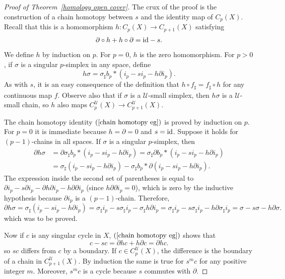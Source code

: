 \begin{proof}[Proof of Theorem~\ref{homology open cover}]
The crux of the proof is the construction of a chain homotopy between $s$ and the identity map of $C_p(X)$. Recall that this is a homomorphism $h:C_p(X)\to C_{p+1}(X)$ satisfying
\begin{align}\label{chain homotopy eg}
\partial\circ h+h\circ\partial=\mathrm{id}-s.
\end{align}
We define $h$ by induction on $p$. For $p=0$, $h$ is the zero homomorphism. For $p>0$, if $\sigma$ is a singular $p$-simplex in any space, define
\[h\sigma=\sigma_\sharp b_p\ast(i_p-si_p-h\partial i_p).\]
As with $s$, it is an easy consequence of the definition that $h\circ f_\sharp=f_\sharp\circ h$ for any continuous map $f$. Observe also that if $\sigma$ is a $\mathcal{U}$-small simplex, then $h\sigma$ is a $\mathcal{U}$-small
chain, so $h$ also maps $C^\mathcal{U}_p(X)\to C^\mathcal{U}_{p+1}(X)$.\par
The chain homotopy identity $(\ref{chain homotopy eg})$ is proved by induction on $p$. For $p=0$ it is immediate because $h=\partial=0$ and $s=\mathrm{id}$. Suppose it holds for $(p-1)$-chains in all spaces. If $\sigma$ is a singular $p$-simplex, then
\begin{align*}
\partial h\sigma&=\partial\sigma_\sharp b_p\ast(i_p-si_p-h\partial i_p)
=\sigma_\sharp\partial b_p\ast(i_p-si_p-h\partial i_p)\\
&=\sigma_\sharp(i_p-si_p-h\partial i_p)-\sigma_\sharp b_p\ast\partial(i_p-si_p-h\partial i_p).
\end{align*}
The expression inside the second set of parentheses is equal to $\partial i_p-s\partial i_p-\partial h\partial i_p-h\partial\partial i_p$ (since $h\partial\partial i_p=0$), which is zero by the inductive hypothesis because $\partial i_p$ is a $(p-1)$-chain. Therefore,
\[\partial h\sigma=\sigma_\sharp(i_p-si_p-h\partial i_p)=\sigma_\sharp i_p-s\sigma_\sharp i_p-\sigma_\sharp h\partial i_p=\sigma_\sharp i_p-s\sigma_\sharp i_p-h\partial\sigma_\sharp i_p=\sigma-s\sigma-h\partial\sigma.\]
which was to be proved.\par
Now if $c$ is any singular cycle in $X$, $(\ref{chain homotopy eg})$ shows that
\[c-sc=\partial hc+h\partial c=\partial hc.\]
so $sc$ differs from $c$ by a boundary. If $c\in C^\mathcal{U}_p(X)$, the difference is the boundary of a chain in $C^\mathcal{U}_{p+1}(X)$. By induction the same is true for $s^mc$ for any positive integer $m$. Moreover, $s^mc$ is a cycle because $s$ commutes with $\partial$.\par

\end{proof}
